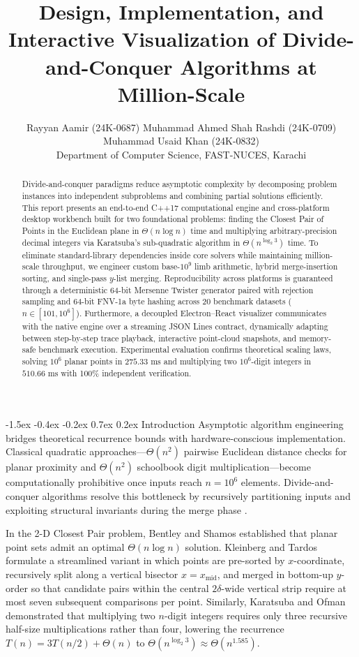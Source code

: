 \documentclass[10pt,twocolumn]{article}
\title{\vspace{-2.2em}\Large\textbf{Design, Implementation, and Interactive Visualization of Divide-and-Conquer Algorithms at Million-Scale}\vspace{-0.4em}}
\author{\small Rayyan Aamir (24K-0687) \quad Muhammad Ahmed Shah Rashdi (24K-0709) \quad Muhammad Usaid Khan (24K-0832)\\
\small Department of Computer Science, FAST-NUCES, Karachi}
\date{\vspace{-1.8em}}
\makeatletter
\renewcommand\section{\@startsection{section}{1}{\z@}%
  {-1.5ex \@plus -0.4ex \@minus -0.2ex}%
  {0.7ex \@plus 0.2ex}%
  {\normalfont\normalsize\bfseries}}
\makeatother
\begin{document}
\maketitle

\begin{abstract}
Divide-and-conquer paradigms reduce asymptotic complexity by decomposing problem instances into independent subproblems and combining partial solutions efficiently. This report presents an end-to-end C++17 computational engine and cross-platform desktop workbench built for two foundational problems: finding the Closest Pair of Points in the Euclidean plane in $\Theta(n \log n)$ time and multiplying arbitrary-precision decimal integers via Karatsuba's sub-quadratic algorithm in $\Theta(n^{\log_2 3})$ time. To eliminate standard-library dependencies inside core solvers while maintaining million-scale throughput, we engineer custom base-$10^9$ limb arithmetic, hybrid merge-insertion sorting, and single-pass $y$-list merging. Reproducibility across platforms is guaranteed through a deterministic 64-bit Mersenne Twister generator paired with rejection sampling and 64-bit FNV-1a byte hashing across 20 benchmark datasets ($n \in [101, 10^6]$). Furthermore, a decoupled Electron--React visualizer communicates with the native engine over a streaming JSON Lines contract, dynamically adapting between step-by-step trace playback, interactive point-cloud snapshots, and memory-safe benchmark execution. Experimental evaluation confirms theoretical scaling laws, solving $10^6$ planar points in $275.33\text{ ms}$ and multiplying two $10^6$-digit integers in $510.66\text{ ms}$ with 100\% independent verification.
\end{abstract}

\section{Introduction}
Asymptotic algorithm engineering bridges theoretical recurrence bounds with hardware-conscious implementation. Classical quadratic approaches---$\Theta(n^2)$ pairwise Euclidean distance checks for planar proximity and $\Theta(n^2)$ schoolbook digit multiplication---become computationally prohibitive once inputs reach $n = 10^6$ elements. Divide-and-conquer algorithms resolve this bottleneck by recursively partitioning inputs and exploiting structural invariants during the merge phase \cite{cormen2022introduction}.

In the 2-D Closest Pair problem, Bentley and Shamos \cite{bentley1976divide} established that planar point sets admit an optimal $\Theta(n \log n)$ solution. Kleinberg and Tardos \cite{kleinberg2006algorithm} formulate a streamlined variant in which points are pre-sorted by $x$-coordinate, recursively split along a vertical bisector $x = x_{\text{mid}}$, and merged in bottom-up $y$-order so that candidate pairs within the central $2\delta$-wide vertical strip require at most seven subsequent comparisons per point. Similarly, Karatsuba and Ofman \cite{karatsuba1962multiplication} demonstrated that multiplying two $n$-digit integers requires only three recursive half-size multiplications rather than four, lowering the recurrence $T(n) = 3T(n/2) + \Theta(n)$ to $\Theta(n^{\log_2 3}) \approx \Theta(n^{1.585})$.
\end{document}
